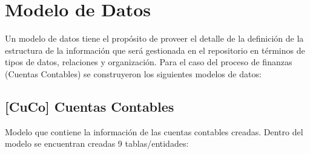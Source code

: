 \section{Modelo de Datos}

Un modelo de datos tiene el propósito de proveer el detalle de la definición de la estructura de la información que será gestionada en el repositorio en términos de tipos de datos, relaciones y organización. Para el caso del proceso de finanzas (Cuentas Contables) se construyeron los siguientes modelos de datos:

\subsection{[CuCo] Cuentas Contables}

Modelo que contiene la información de las cuentas contables creadas. Dentro del modelo se encuentran creadas 9 tablas/entidades:
